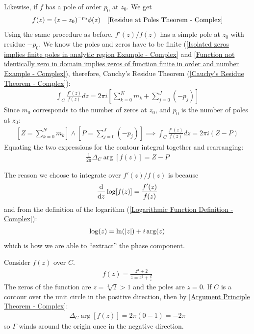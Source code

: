 \documentclass[12pt, english]{book}
\makeatletter
\renewenvironment{proof}[1][\proofname]{\par
	\pushQED{\qed}%
	\normalfont \topsep6\p@\@plus6\p@\relax
	\list{}{%
		\settowidth{\leftmargin}{\itshape\proofname:\hskip\labelsep}%
		\setlength{\labelwidth}{0pt}%
		\setlength{\itemindent}{-\leftmargin}%
	}%
	\item[\hskip\labelsep\itshape#1\@addpunct{:}]\ignorespaces
	}{ \popQED\endlist\@endpefalse}
\makeatother
\begin{document}
\begin{proof}
		Likewise, if \(f\) has a pole of order \(p_0\) at \(z_0\). We get
		\begin{align*}
			f(z) &= (z-z_0)^{-p_0} \phi(z) & \text{\Cref{Residue at Poles Theorem - Complex}}
		\end{align*}
		Using the same procedure as before, \(f'(z)/f(z)\) has a simple pole at \(z_0\) with residue \(-p_0\). We know the poles and zeros have to be finite (\cref{Isolated zeros implies finite poles in analytic region Example - Complex} and \cref{Function not identically zero in domain implies zeros of function finite in order and number Example - Complex}), therefore, Cauchy's Residue Theorem (\cref{Cauchy's Residue Theorem - Complex}):
		\begin{align*}
			\int_{C} \frac{f'(z)}{f(z)} dz 
			= 2\pi i \left[\sum_{k=0}^{N} m_k + \sum_{j=0}^{J} (-p_j) \right] 
		\end{align*}
		Since \(m_0\) corresponds to the number of zeros at \(z_0\), and \(p_0\) is the number of poles at \(z_0\):
		\begin{align*}
			\left[Z = \sum_{k=0}^{N} m_k\right] \land \left[P = \sum_{j=0}^{J} (-p_j)\right]
			\implies \int_{C} \frac{f'(z)}{f(z)} dz = 2\pi i (Z - P)
		\end{align*}
		Equating the two expressions for the contour integral together and rearranging:
		\begin{align*}
			\frac{1}{2\pi} \Delta_C \arg[f(z)] = Z - P
		\end{align*}
	\end{proof}

	\begin{observation}
		The reason we choose to integrate over \(f'(z)/f(z)\) is because
		\begin{align*}
			\dv{z} \log[f(z)] = \frac{f'(z)}{f(z)}
		\end{align*}
		and from the definition of the logarithm (\cref{Logarithmic Function Definition - Complex}):
		\begin{align*}
			\log(z) = \ln(\abs{z}) + i \arg(z)
		\end{align*}
		which is how we are able to ``extract'' the phase component.  
	\end{observation}
	
	\begin{example}
		Consider \(f(z)\) over \(C\). 
		\begin{align*}
			f(z) = \frac{z^3 + 2}{z = z^2 + \frac{2}{z}}
		\end{align*}
		The zeros of the function are \(z = \sqrt[3]{2} > 1\) and the poles are \(z = 0\). If \(C\) is a contour over the unit circle in the positive direction, then by \cref{Argument Principle Theorem - Complex}:
		\begin{align*}
			\Delta_{C} \arg[f(z)] = 2\pi (0-1) = -2\pi
		\end{align*}
		so \(\Gamma\) winds around the origin once in the negative direction.
	\end{example}
\end{document}

